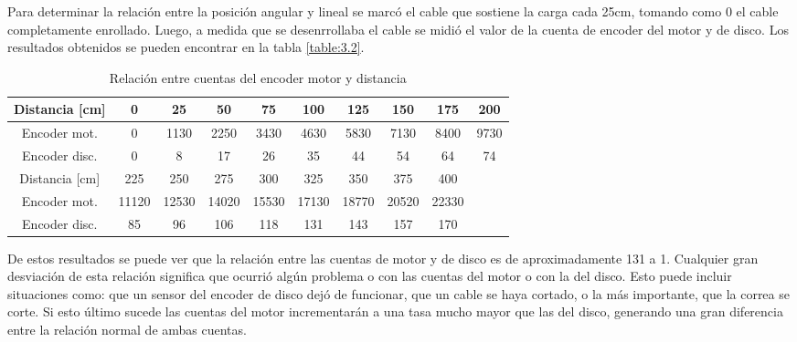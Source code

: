 Para determinar la relación entre la posición angular y lineal se marcó el cable que sostiene la carga cada 25cm, tomando como 0 el cable completamente enrollado. Luego, a medida que se desenrrollaba el cable se midió el valor de la cuenta de encoder del motor y de disco. Los resultados obtenidos se pueden encontrar en la tabla \ref{table:3.2}.

\begin{table}[!ht]
	\begin{center}
		
		\begin{tabular}{|c|c|c|c|c|c|c|c|c|c|}
			\hline
			\rowcolor{OODlightblue}
			Distancia [cm] & 0 & 25 & 50 & 75 & 100 & 125 & 150 & 175 & 200  \\
			\hline
			Encoder mot. & 0 & 1130 & 2250 & 3430 & 4630 & 5830 & 7130 & 8400 & 9730 \\
			\hline
			Encoder disc. & 0 & 8 & 17 & 26 & 35 & 44 & 54 & 64 & 74 \\ 
			\hline \hline
			\rowcolor{OODlightblue}
			Distancia [cm]  & 225 & 250 & 275 & 300 & 325 & 350 & 375 & 400 & \\
			\hline
			Encoder mot. & 11120 & 12530 & 14020 & 15530 & 17130 & 18770 & 20520 & 22330 & \\
			\hline 
			Encoder disc. & 85 & 96 & 106 & 118 & 131 & 143 & 157 & 170 & \\ 
			\hline
		\end{tabular}
	\end{center}
	\caption{Relación entre cuentas del encoder motor y distancia}
	\label{table:\thetable}
\end{table}

De estos resultados se puede ver que la relación entre las cuentas de motor y de disco es de aproximadamente 131 a 1. Cualquier gran desviación de esta relación significa que ocurrió algún problema o con las cuentas del motor o con la del disco. Esto puede incluir situaciones como: que un sensor del encoder de disco dejó de funcionar, que un cable se haya cortado, o la más importante, que la correa se corte. Si esto último sucede las cuentas del motor incrementarán a una tasa mucho mayor que las del disco, generando una gran diferencia entre la relación normal de ambas cuentas.

